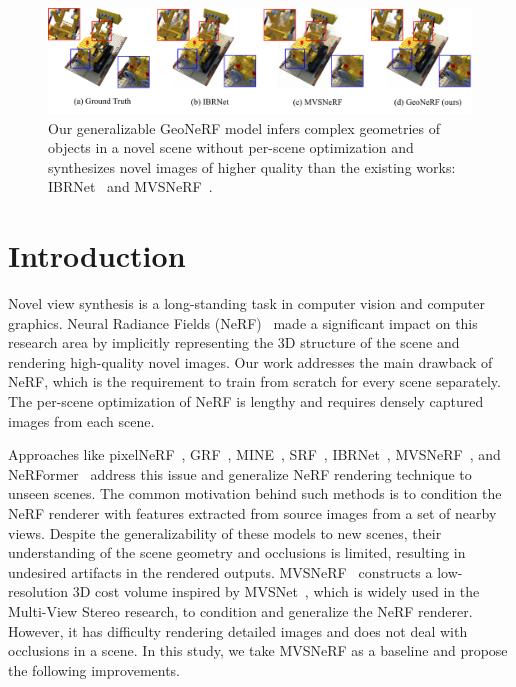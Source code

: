 \begin{figure}[t]
    \begin{center}
        \includegraphics[width=1.0\linewidth]{images/chapter3/figures/intro.jpg}
    \end{center}
   \caption{Our generalizable GeoNeRF model infers complex geometries of objects in a novel scene without per-scene optimization and synthesizes novel images of higher quality than the existing works: IBRNet~\citep{wang2021ibrnet} and MVSNeRF~\citep{chen2021mvsnerf}.}
\end{figure}

\section{Introduction}

Novel view synthesis is a long-standing task in computer vision and computer graphics. Neural Radiance Fields (NeRF)~\citep{mildenhall2020nerf} made a significant impact on this research area by implicitly representing the 3D structure of the scene and rendering high-quality novel images. Our work addresses the main drawback of NeRF, which is the requirement to train from scratch for every scene separately. The per-scene optimization of NeRF is lengthy and requires densely captured images from each scene.

Approaches like pixelNeRF~\citep{yu2021pixelnerf}, GRF~\citep{trevithick2021grf}, MINE~\citep{li2021mine}, SRF~\citep{chibane2021stereo}, IBRNet~\citep{wang2021ibrnet}, MVSNeRF~\citep{chen2021mvsnerf}, and NeRFormer~\citep{reizenstein2021common} address this issue and generalize NeRF rendering technique to unseen scenes. The common motivation behind such methods is to condition the NeRF renderer with features extracted from source images from a set of nearby views. Despite the generalizability of these models to new scenes, their understanding of the scene geometry and occlusions is limited, resulting in undesired artifacts in the rendered outputs. MVSNeRF~\citep{chen2021mvsnerf} constructs a low-resolution 3D cost volume inspired by MVSNet~\citep{yao2018mvsnet}, which is widely used in the Multi-View Stereo research, to condition and generalize the NeRF renderer. However, it has difficulty rendering detailed images and does not deal with occlusions in a scene. In this study, we take MVSNeRF as a baseline and propose the following improvements.

